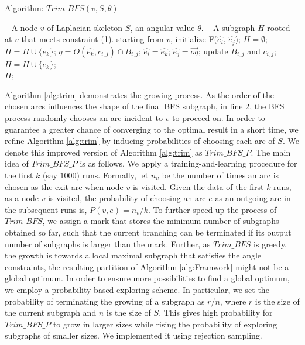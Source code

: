 \begin{algorithm}[t]
\caption{Algorithm: $Trim\_BFS(v, S,\theta)$}
\label{alg:trim}
\begin{algorithmic}[1]
\REQUIRE~
A node $v$ of Laplacian skeleton $S$, an angular value $\theta$.
\ENSURE~
 A subgraph $H$ rooted at $v$ that meets constraint (1).
\STATE starting from $v$, initialize F($\hat{e_i}$, $\hat{e_j}$); $H = \emptyset $;
  \STATE  $H = H \cup \{e_k\}$;
  \STATE $q = O( \hat{e_k}, c_{i,j}) \cap B_{i,j}$;
  \STATE  $\hat{e_i}=  \hat{e_k}$;
  \STATE $\hat{e_j} =  \overrightarrow{oq}$;
  \STATE  update $B_{i,j}$ and $c_{i,j}$;
  \STATE  $H = H \cup \{e_k\}$;
  \ENDIF
\ENDWHILE
\label{code:fram:select} \\
\RETURN  $H$;
\end{algorithmic}
\end{algorithm}

Algorithm \ref{alg:trim} demonstrates the growing process. As the order of the chosen arcs influences the shape of the final BFS subgraph, in line $2$, the BFS process randomly chooses an arc incident to $v$ to proceed on. In order to guarantee a greater chance of converging to the optimal result in a short time, we refine Algorithm \ref{alg:trim} by inducing probabilities of choosing each arc of $S$. We denote this improved version of Algorithm \ref{alg:trim} as \textbf{$Trim\_BFS\_P$}. The main idea of $Trim\_BFS\_P$ is as follows.
We apply a training-and-learning procedure for the first $k$ (say $1000$) runs. Formally, let $n_v$ be the number of times an arc is chosen as the exit arc when node $v$ is visited. Given the data of the first $k$ runs, as a node $v$ is visited, the probability of choosing an arc $e$ as an outgoing arc in the subsequent runs is, $P(v, e) = n_v/k$. To further speed up the process of $Trim\_BFS$, we assign a mark that stores the minimum number of subgraphs obtained so far, such that the current branching can be terminated if its output number of subgraphs is larger than the mark. Further, as $Trim\_BFS$ is greedy, the growth is towards a local maximal subgraph that satisfies the angle constraints, the resulting partition of Algorithm \ref{alg:Framwork} might not be a global optimum. In order to ensure more possibilities to find a global optimum, we employ a probability-based exploring scheme. In particular, we set the probability of terminating the growing of a subgraph as $r/n$, where $r$ is the size of the current subgraph and $n$ is the size of $S$. This gives high probability for $Trim\_BFS\_P$ to grow in larger sizes while rising the probability of exploring subgraphs of smaller sizes. We implemented it using rejection sampling.


